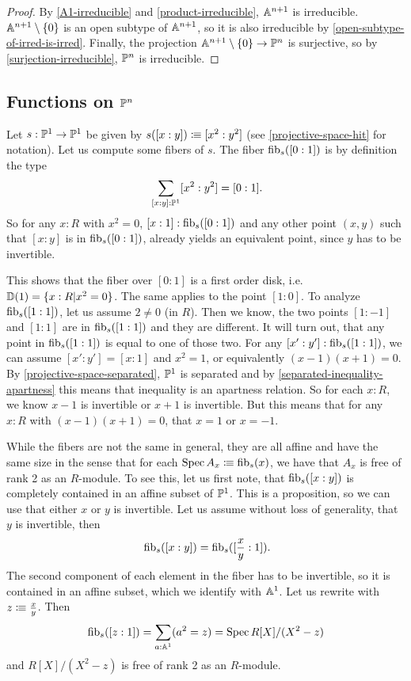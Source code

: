 \begin{proof}
  By \cref{A1-irreducible} and \cref{product-irreducible}, $\mathbb{A}^{n+1}$ is irreducible.
  $\mathbb{A}^{n+1}\setminus\{0\}$ is an open subtype of $\mathbb{A}^{n+1}$,
  so it is also irreducible by \cref{open-subtype-of-irred-is-irred}.
  Finally, the projection $\mathbb{A}^{n+1}\setminus\{0\}\to\mathbb{P}^n$ is surjective,
  so by \cref{surjection-irreducible}, $\mathbb{P}^n$ is irreducible.
\end{proof}
\subsection{Functions on $\mathbb{P}^n$}

\begin{example}
  Let $s:\mathbb{P}^1\to \mathbb{P}^1$ be given by $s([x:y])\vcentcolon\mspace{-1.2mu}\equiv [x^2:y^2]$
  (see \cref{projective-space-hit} for notation).
  Let us compute some fibers of $s$. The fiber $\mathrm{fib}_s([0:1])$ is
  by definition the type
  \[
    \sum_{[x:y]:\bP^1}[x^2:y^2]=[0:1]\rlap{.}
  \]
  So for any $x:R$ with $x^2=0$, $[x:1]:\mathrm{fib}_s([0:1])$  and
  any other point $(x,y)$ such that $[x:y]$ is in $\mathrm{fib}_s([0:1])$,
  already yields an equivalent point, since $y$ has to be invertible.

  This shows that the fiber over $[0:1]$ is a first order disk, i.e. $\mathbb{D}(1)=\{x:R|x^2=0\}$.
  The same applies to the point $[1:0]$.
  To analyze $\mathrm{fib}_s([1:1])$, let us assume $2\neq 0$ (in $R$).
  Then we know, the two points $[1:-1]$ and $[1:1]$ are in $\mathrm{fib}_s([1:1])$ and they are different.
  It will turn out, that any point in $\mathrm{fib}_s([1:1])$ is equal to one of those two.
  For any $[x':y']:\mathrm{fib}_s([1:1])$, we can assume $[x':y']=[x:1]$ and $x^2=1$, or equivalently $(x-1)(x+1)=0$.
  By \cref{projective-space-separated}, $\mathbb{P}^1$ is separated and by \cref{separated-inequality-apartness}
  this means that inequality is an apartness relation.
  So for each $x:R$, we know $x-1$ is invertible or $x+1$ is invertible.
  But this means that for any $x:R$ with $(x-1)(x+1)=0$, that $x=1$ or $x=-1$.

  While the fibers are not the same in general,
  they are all affine and have the same size in the sense that for each $\operatorname{Spec} A_x\vcentcolon\mspace{-1.2mu}\equiv \mathrm{fib}_s(x)$,
  we have that $A_x$ is free of rank 2 as an $R$-module.
  To see this, let us first note,
  that $\mathrm{fib}_s([x:y])$ is completely contained in an affine subset of $\mathbb{P}^1$.
  This is a proposition, so we can use that either $x$ or $y$ is invertible.
  Let us assume without loss of generality, that $y$ is invertible,
  then
  \[
    \fib_s([x:y])=\fib_s([\frac{x}{y}:1])
    \rlap{.}
  \]
  The second component of each element in the fiber has to be invertible,
  so it is contained in an affine subset, which we identify with $\mathbb{A}^1$.
  Let us rewrite with $z\vcentcolon\mspace{-1.2mu}\equiv \frac{x}{y}$.
  Then
  \[
    \mathrm{fib}_s([z:1])=\sum_{a:\mathbb{A}^1}(a^2=z)=\operatorname{Spec} R[X]/(X^2-z)
  \]
  and $R[X]/(X^2-z)$ is free of rank 2 as an $R$-module.
\end{example}

